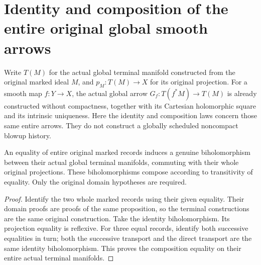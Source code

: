 \section{Identity and composition of the entire original global smooth arrows}

Write $T(M)$ for the actual global terminal manifold constructed from the
original marked ideal $M$, and $p_M:T(M)\to X$ for its original projection.
For a smooth map $f:Y\to X$, the actual global arrow
$G_f:T(f^*M)\to T(M)$ is already constructed without compactness, together
with its Cartesian holomorphic square and its intrinsic uniqueness.  Here the
identity and composition laws concern those same entire arrows.  They do not
construct a globally scheduled noncompact blowup history.

\begin{theorem}
\label{hir:original-global-terminal-whole-record-transport}
\leanok
An equality of entire original marked records induces a genuine
biholomorphism between their actual global terminal manifolds, commuting with
their whole original projections.  These biholomorphisms compose according to
transitivity of equality.  Only the original domain hypotheses are required.
\end{theorem}
\begin{proof}
Identify the two whole marked records using their given equality. Their
domain proofs are proofs of the same proposition, so the terminal
constructions are the same original construction.  Take the identity
biholomorphism. Its projection equality is reflexive. For three equal records,
identify both successive equalities in turn; both the successive transport
and the direct transport are the same identity biholomorphism. This proves
the composition equality on their entire actual terminal manifolds.
\end{proof}

